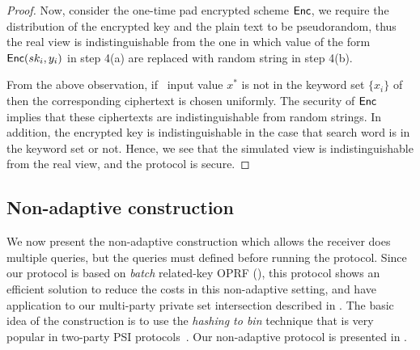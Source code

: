 \begin{proof}
	Now, consider the one-time pad encrypted scheme $\mathsf{Enc}$,  we require the distribution of the encrypted key and the plain text to be pseudorandom, thus the real view is indistinguishable from the one in which value of the form  $\mathsf{Enc}(sk_i, y_i)$ in step 4(a) are replaced with random string in step 4(b). 
	
	From the above observation, if \RR\ input value $x^*$ is not in the keyword set $\{x_i\}$ of \SS\, then the corresponding ciphertext is chosen uniformly. The security of $\mathsf{Enc}$ implies that these ciphertexts are indistinguishable from random strings. In addition, the encrypted key is indistinguishable in the case that search word is in the keyword set or not.  Hence, we see that the simulated view is indistinguishable from the real view, and the protocol is secure.
\end{proof}

\subsection{Non-adaptive \OPPRF construction}
\label{sect:constrnSSOT}


We now present the non-adaptive \OPPRF construction which allows the receiver does multiple \OPPRF queries, but the queries must defined before running the protocol. Since our \OPPRF protocol is based on \textit{batch} related-key OPRF (\batchOPRF), this protocol shows an efficient solution to reduce the costs in this non-adaptive setting, and have application to our multi-party private set intersection described in . The basic idea of the construction is to use the \textit{hashing to bin} technique that is very popular in two-party PSI protocols~\cite{DBLP:conf/uss/Pinkas0SZ15,DBLP:conf/uss/Pinkas0Z14}. Our  non-adaptive \OPPRF protocol is presented in . 


